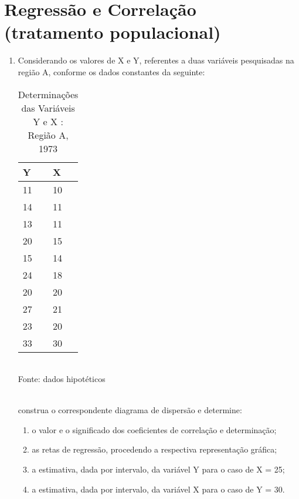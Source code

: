 \chapter{Regressão e Correlação (tratamento populacional) }

\begin{enumerate}[resume]

\item Considerando os valores de X e Y, referentes a duas variáveis pesquisadas na região A, conforme os dados constantes da seguinte:
	\begin{table}[!htb]
	\centering
	\caption{Determinações das Variáveis Y e X : Região A, 1973}
	\vspace{0.5cm}
	\begin{tabular}{ll}
	Y & X \\
	\hline 
	11 & 10  \\
	14 & 11  \\
	13 & 11  \\
	20 & 15  \\
	15 & 14  \\
	24 & 18  \\
	20 & 20  \\
	27 & 21  \\
	23 & 20  \\
	33 & 30  \\
	\end{tabular}\\
	Fonte: dados hipotéticos\\
	\end{table}\\	
	construa o correspondente diagrama de dispersão e determine:
	\begin{enumerate}
	\item o valor e o significado dos coeficientes de correlação e determinação;
	\item as retas de regressão, procedendo a respectiva representação gráfica;
	\item a estimativa, dada por intervalo, da variável Y para o caso de X = 25;
	\item	a estimativa, dada por intervalo, da variável X para o caso de Y = 30.
	\end{enumerate}



\end{enumerate}
